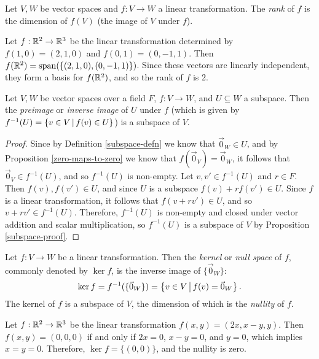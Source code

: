 \begin{defn}
    Let $V, W$ be vector spaces and $f: V \to W$ a linear transformation. The \emph{rank} of $f$ is the dimension of $f(V)$ (the image of $V$ under $f$).
\end{defn}

\begin{exmp}
    Let $f: \mathbb{R}^2 \to \mathbb{R}^3$ be the linear transformation determined by $f(1, 0) = (2, 1, 0)$ and $f(0, 1) = (0, -1, 1)$. Then $f(\mathbb{R}^2) = \operatorname{span}(\{(2, 1, 0), (0, -1, 1)\})$. Since these vectors are linearly independent, they form a basis for $f(\mathbb{R}^2)$, and so the rank of $f$ is 2.
\end{exmp}

\begin{prop}
    Let $V, W$ be vector spaces over a field $F$, $f: V \to W$, and $U \subseteq W$ a subspace. Then the \emph{preimage} or \emph{inverse image} of $U$ under $f$ (which is given by $f^{-1}(U) = \left\{v \in V \,\middle|\, f(v) \in U\right\}$) is a subspace of $V$.
\end{prop}

\begin{proof}
    Since by Definition \ref{subspace-defn} we know that $\vec{0}_W \in U$, and by Proposition \ref{zero-maps-to-zero} we know that $f(\vec{0}_V) = \vec{0}_W$, it follows that $\vec{0}_V \in f^{-1}(U)$, and so $f^{-1}(U)$ is non-empty. Let $v, v' \in f^{-1}(U)$ and $r \in F$. Then $f(v), f(v') \in U$, and since $U$ is a subspace $f(v) + rf(v') \in U$. Since $f$ is a linear transformation, it follows that $f(v + rv') \in U$, and so $v + rv' \in f^{-1}(U)$. Therefore, $f^{-1}(U)$ is non-empty and closed under vector addition and scalar multiplication, so $f^{-1}(U)$ is a subspace of $V$ by Proposition \ref{subspace-proof}.
\end{proof}

\begin{defn}
    Let $f: V \to W$ be a linear transformation. Then the \emph{kernel} or \emph{null space} of $f$, commonly denoted by $\ker f$, is the inverse image of $\{\vec{0}_W\}$: \[\ker f = f^{-1}(\{\vec{0}_W\}) = \left\{v \in V \,\middle|\, f(v) = \vec{0}_W\right\}.\] The kernel of $f$ is a subspace of $V$, the dimension of which is the \emph{nullity} of $f$.
\end{defn}

\begin{exmp}
    Let $f: \mathbb{R}^2 \to \mathbb{R}^3$ be the linear transformation $f(x, y) = (2x, x-y, y)$. Then $f(x, y) = (0, 0, 0)$ if and only if $2x = 0$, $x - y = 0$, and $y = 0$, which implies $x = y = 0$. Therefore, $\ker f = \{(0, 0)\}$, and the nullity is zero.
\end{exmp}

